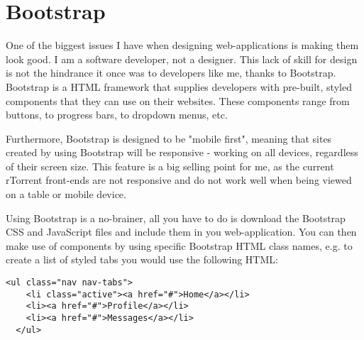 
\section{Bootstrap}
One of the biggest issues I have when designing web-applications is making them look good. I am a software developer, not a designer. This lack of skill for design is not the hindrance it once was to developers like me, thanks to Bootstrap. Bootstrap is a HTML framework that supplies developers with pre-built, styled components that they can use on their websites. These components range from buttons, to progress bars, to dropdown menus, etc.

Furthermore, Bootstrap is designed to be "mobile first", meaning that sites created by using Bootstrap will be responsive - working on all devices, regardless of their screen size. This feature is a big selling point for me, as the current rTorrent front-ends are not responsive and do not work well when being viewed on a table or mobile device.

Using Bootstrap is a no-brainer, all you have to do is download the Bootstrap CSS and JavaScript files and include them in you web-application. You can then make use of components by using specific Bootstrap HTML class names, e.g. to create a list of styled tabs you would use the following HTML:

\vspace{20px}
\begin{lstlisting}[caption=Bootstrap tabs]
  <ul class="nav nav-tabs">
    <li class="active"><a href="#">Home</a></li>
    <li><a href="#">Profile</a></li>
    <li><a href="#">Messages</a></li>
  </ul>
\end{lstlisting}


















